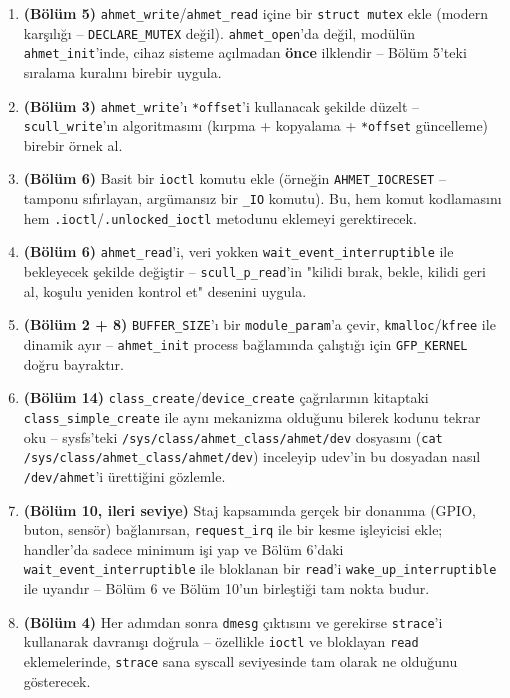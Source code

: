 \documentclass[11pt,a4paper]{article}
\begin{document}
\begin{enumerate}[leftmargin=1.2cm]
  \item \textbf{(Bölüm 5)} \texttt{ahmet\_write}/\texttt{ahmet\_read}
  içine bir \texttt{struct mutex} ekle (modern karşılığı --
  \texttt{DECLARE\_MUTEX} değil). \texttt{ahmet\_open}'da değil,
  modülün \texttt{ahmet\_init}'inde, cihaz sisteme açılmadan
  \textbf{önce} ilklendir -- Bölüm 5'teki sıralama kuralını birebir
  uygula.
  \item \textbf{(Bölüm 3)} \texttt{ahmet\_write}'ı \texttt{*offset}'i
  kullanacak şekilde düzelt -- \texttt{scull\_write}'ın algoritmasını
  (kırpma + kopyalama + \texttt{*offset} güncelleme) birebir örnek al.
  \item \textbf{(Bölüm 6)} Basit bir \texttt{ioctl} komutu ekle
  (örneğin \texttt{AHMET\_IOCRESET} -- tamponu sıfırlayan, argümansız
  bir \texttt{\_IO} komutu). Bu, hem komut kodlamasını hem
  \texttt{.ioctl}/\texttt{.unlocked\_ioctl} metodunu eklemeyi
  gerektirecek.
  \item \textbf{(Bölüm 6)} \texttt{ahmet\_read}'i, veri yokken
  \texttt{wait\_event\_interruptible} ile bekleyecek şekilde
  değiştir -- \texttt{scull\_p\_read}'in "kilidi bırak, bekle, kilidi
  geri al, koşulu yeniden kontrol et" desenini uygula.
  \item \textbf{(Bölüm 2 + 8)} \texttt{BUFFER\_SIZE}'ı bir
  \texttt{module\_param}'a çevir, \texttt{kmalloc}/\texttt{kfree} ile
  dinamik ayır -- \texttt{ahmet\_init} process bağlamında çalıştığı
  için \texttt{GFP\_KERNEL} doğru bayraktır.
  \item \textbf{(Bölüm 14)} \texttt{class\_create}/\texttt{device\_create}
  çağrılarının kitaptaki \texttt{class\_simple\_create} ile aynı
  mekanizma olduğunu bilerek kodunu tekrar oku -- sysfs'teki
  \texttt{/sys/class/ahmet\_class/ahmet/dev} dosyasını
  (\texttt{cat /sys/class/ahmet\_class/ahmet/dev}) inceleyip udev'in
  bu dosyadan nasıl \texttt{/dev/ahmet}'i ürettiğini gözlemle.
  \item \textbf{(Bölüm 10, ileri seviye)} Staj kapsamında gerçek bir
  donanıma (GPIO, buton, sensör) bağlanırsan, \texttt{request\_irq}
  ile bir kesme işleyicisi ekle; handler'da sadece minimum işi yap ve
  Bölüm 6'daki \texttt{wait\_event\_interruptible} ile bloklanan bir
  \texttt{read}'i \texttt{wake\_up\_interruptible} ile uyandır --
  Bölüm 6 ve Bölüm 10'un birleştiği tam nokta budur.
  \item \textbf{(Bölüm 4)} Her adımdan sonra \texttt{dmesg} çıktısını
  ve gerekirse \texttt{strace}'i kullanarak davranışı doğrula --
  özellikle \texttt{ioctl} ve bloklayan \texttt{read} eklemelerinde,
  \texttt{strace} sana syscall seviyesinde tam olarak ne olduğunu
  gösterecek.
\end{enumerate}
\end{document}
